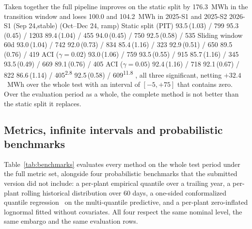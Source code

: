 \documentclass[preprint,3p,times]{elsarticle}
\providecommand{\DIFaddtex}[1]{{\protect\color{blue} \sf #1}} %
\providecommand{\DIFdeltex}[1]{{\protect\color{red} \scriptsize #1}} %
\providecommand{\DIFaddFL}[1]{\DIFadd{#1}} %
\providecommand{\DIFdelFL}[1]{\DIFdel{#1}} %
\providecommand{\DIFaddbeginFL}{} %
\providecommand{\DIFaddendFL}{} %
\providecommand{\DIFdelbeginFL}{} %
\providecommand{\DIFdelendFL}{} %
\providecommand{\DIFadd}[1]{\texorpdfstring{\DIFaddtex{#1}}{#1}} %
\providecommand{\DIFdel}[1]{\texorpdfstring{\DIFdeltex{#1}}{}} %
\begin{document}
\DIFaddFL{Taken together the full pipeline improves on the static split by 176.3~MWh in the transition window and loses 100.0 and 104.2~MWh in }\DIFaddendFL 2025-S1 \DIFdelbeginFL %
\DIFdelendFL \DIFaddbeginFL \DIFaddFL{and }\DIFaddendFL 2025-S2\DIFdelbeginFL %
\DIFdelFL{2026-S1 }%
\DIFdelFL{(Sep 24,stable) }%
\DIFdelFL{(Oct--Dec 24, ramp) }%
\DIFdelFL{Static split (PIT)      }%
\DIFdelFL{93.5\,(1.03) / 799 }%
\DIFdelFL{95.3\,(0.45) / 1203 }%
\DIFdelFL{89.4\,(1.04) / 455 }%
\DIFdelFL{94.0\,(0.45) / 750 }%
\DIFdelFL{92.5\,(0.58) / 535 }%
\DIFdelFL{Sliding window 60d      }%
\DIFdelFL{93.0\,(1.04) / 742 }%
\DIFdelFL{92.0\,(0.73) / 834  }%
\DIFdelFL{85.4\,(1.16) / 323 }%
\DIFdelFL{92.9\,(0.51) / 650 }%
\DIFdelFL{89.5\,(0.76) / 419 }%
\DIFdelFL{ACI ($\gamma{=}0.02$)   }%
\DIFdelFL{93.0\,(1.06) / 759 }%
\DIFdelFL{93.5\,(0.55) / 915  }%
\DIFdelFL{85.7\,(1.16) / 345 }%
\DIFdelFL{93.5\,(0.49) / 669 }%
\DIFdelFL{89.1\,(0.76) / 405 }%
\DIFdelFL{ACI ($\gamma{=}0.05$)   }%
\DIFdelFL{92.4\,(1.16) / 718 }%
\DIFdelFL{92.1\,(0.67) / 822  }%
\DIFdelFL{86.6\,(1.14) / 405\textsuperscript{2.8} }%
\DIFdelFL{92.5\,(0.58) / 609\textsuperscript{11.8} }%
\DIFdelendFL \DIFaddbeginFL \DIFaddFL{, all three significant, netting $+32.4$~MWh over the whole test with an interval of $[-5,+75]$ that contains zero. Over the evaluation period as a whole, the complete method is not better than the static split it replaces.
}

\subsection{Metrics, infinite intervals and probabilistic benchmarks}
\label{sec:metricas}

\DIFaddFL{Table~\ref{tab:benchmarks} evaluates every method on the whole test period under the full metric set, alongside four probabilistic benchmarks that the submitted version did not include: a per-plant empirical quantile over a trailing year, a per-plant rolling historical distribution over 60 days, a one-sided conformalized quantile regression~\cite{romano2019} on the multi-quantile predictive, and a per-plant zero-inflated lognormal fitted without covariates. All four respect the same nominal level, the same embargo and the same evaluation rows.
}
\end{document}
